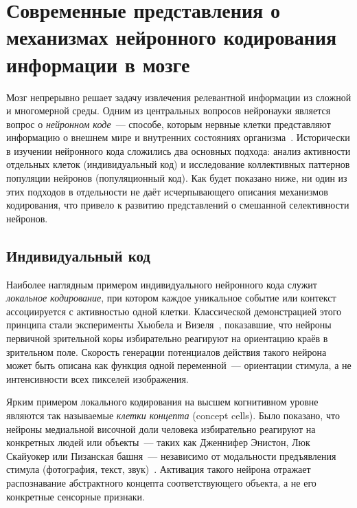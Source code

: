 
\section{Современные представления о механизмах нейронного кодирования информации в мозге}
\label{sec:coding}

Мозг непрерывно решает задачу извлечения релевантной информации из сложной и многомерной среды. Одним из центральных вопросов нейронауки является вопрос о \textit{нейронном коде}~--- способе, которым нервные клетки представляют информацию о внешнем мире и внутренних состояниях организма~\cite{DayanAbbott2001}. Исторически в изучении нейронного кода сложились два основных подхода: анализ активности отдельных клеток (индивидуальный код) и исследование коллективных паттернов популяции нейронов (популяционный код). Как будет показано ниже, ни один из этих подходов в отдельности не даёт исчерпывающего описания механизмов кодирования, что привело к развитию представлений о смешанной селективности нейронов.

\subsection{Индивидуальный код}
\label{sec:local_coding}

Наиболее наглядным примером индивидуального нейронного кода служит \textit{локальное кодирование}, при котором каждое уникальное событие или контекст ассоциируется с активностью одной клетки. Классической демонстрацией этого принципа стали эксперименты Хьюбела и Визеля~\cite{HubelWiesel1962}, показавшие, что нейроны первичной зрительной коры избирательно реагируют на ориентацию краёв в зрительном поле. Скорость генерации потенциалов действия такого нейрона может быть описана как функция одной переменной~--- ориентации стимула, а не интенсивности всех пикселей изображения.

Ярким примером локального кодирования на высшем когнитивном уровне являются так называемые \textit{клетки концепта} (concept cells). Было показано, что нейроны медиальной височной доли человека избирательно реагируют на конкретных людей или объекты~--- таких как Дженнифер Энистон, Люк Скайуокер или Пизанская башня~--- независимо от модальности предъявления стимула (фотография, текст, звук)~\cite{concepts}. Активация такого нейрона отражает распознавание абстрактного концепта соответствующего объекта, а не его конкретные сенсорные признаки.

